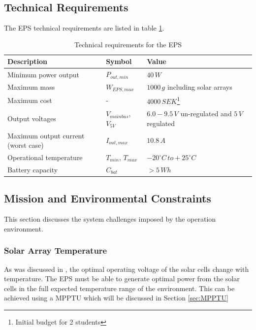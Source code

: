 \subsection{Technical Requirements}
The \ac{EPS} technical requirements are listed in table \ref{tab:technical_requirements}.
%
\begin{table}[H]
\centering
\caption{Technical requirements for the \ac{EPS}}
\label{tab:technical_requirements}
\begin{minipage}{\textwidth}
\begin{tabular}{p{}p{}p{}}
\hline
\textbf{Description} & \textbf{Symbol} & \textbf{Value}\\
\hline
Minimum power output & $P_{out,min}$ & $40\,W$\\
Maximum mass & $W_{EPS,max}$ & $1000\,g$ including solar arrays\\
Maximum cost & - & $4000\,SEK$\footnote{Initial budget for 2 students}\\
Output voltages & $V_{mainbus}$, $V_{5V}$ & $6.0-9.5\,V$ un-regulated and $5\,V$ regulated\\
Maximum output current (worst case) & $I_{out,max}$ & $10.8\,A$\\
Operational temperature & $T_{min}$, $T_{max}$ & $-20^{\circ}C\,to +25^{\circ}C$\\
Battery capacity & $C_{bat}$ & $>5\,Wh$\\
\hline
\end{tabular}\par
\vspace{-0.75\skip\footins}
\renewcommand{\footnoterule}{}
\end{minipage}
\end{table}

\subsection{Mission and Environmental Constraints}
\label{subsec:environmental_requirements}
This section discusses the system challenges imposed by the operation environment.

\subsubsection*{Solar Array Temperature}
As was discussed in \cite{PDR}, the optimal operating voltage of the solar cells change with temperature. The \ac{EPS} must be able to generate optimal power from the solar cells in the full expected temperature range of the environment. This can be achieved using a \ac{MPPTU} which will be discussed in Section \ref{sec:MPPTU}

